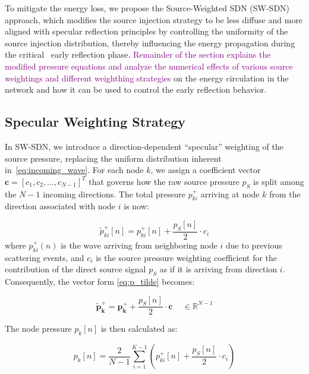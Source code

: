 \documentclass[journal]{IEEEtran}
\begin{document}
To mitigate the energy loss, we propose the Source-Weighted SDN (SW-SDN) approach, which modifies the source injection strategy to be less diffuse and more aligned with specular reflection principles by controlling the uniformity of the source injection distribution, thereby influencing the energy propagation during the critical~\cite{karjalainen2005,Barron1988} early reflection phase.
\textcolor{purple}{
Remainder of the section explains the modified pressure equations and analyze the numerical effects of various source weightings and 
different weighthing strategies
}
on the energy circulation in the network and how it can be used to control the early reflection behavior. 

\subsection{Specular Weighting Strategy}
\label{sec:source_weighting_strategy}

In SW-SDN, we introduce a direction-dependent “specular” weighting of the source pressure, replacing the uniform distribution inherent in~\eqref{eq:incoming_wave}. For each node \(k\), we assign a coefficient vector \(\mathbf{c} = [c_1, c_2, \ldots, c_{N-1}]^T\) that governs how the raw source pressure \(p_{S}\) is split among the \(N-1\) incoming directions. The total pressure \(p_{ki}^+\) arriving at node \(k\) from the direction associated with node \(i\) is now:

\begin{equation}
    \label{eq:incoming_wave_easy}
    \tilde p_{ki}^+[n] = p_{ki}^{+}[n] + \frac{p_{S}[n]}{2} \cdot c_{i}
\end{equation}
%
where \(p_{ki}^{+}(n)\) is the wave arriving from neighboring node \(i\) due to previous scattering events, and \(c_{i}\) is the source pressure weighting coefficient for the contribution of the direct source signal \(p_{S}\) as if it is arriving from direction \(i\). Consequently, the vector form \eqref{eq:p_tilde} becomes:

\begin{equation}
\label{eq:p_tilde_new}
\mathbf{\tilde p_{k}^{+}}
= \mathbf{p_{k}^{+}}
+ \frac{p_{S}[n]}{2}\cdot\mathbf{c}\,\quad \in \mathbb{R}^{N-1}
\end{equation}

The node pressure \(p_k[n]\) is then calculated as:

\begin{equation}
    \label{eq:node_pressure_easy}
    p_k[n] = \frac{2}{N-1} \sum_{i=1}^{K-1} \left(p_{ki}^+[n] + \frac{p_{S}[n]}{2} \cdot c_{i}\right)
\end{equation}
\end{document}
